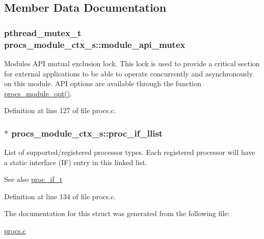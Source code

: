 \subsection{Member Data Documentation}
\subsubsection[{\texorpdfstring{module\+\_\+api\+\_\+mutex}{module_api_mutex}}]{\setlength{\rightskip}{0pt plus 5cm}pthread\+\_\+mutex\+\_\+t procs\+\_\+module\+\_\+ctx\+\_\+s\+::module\+\_\+api\+\_\+mutex}\hypertarget{structprocs__module__ctx__s_a10c3a0b462ead663af1b117abdfdadaa}{}\label{structprocs__module__ctx__s_a10c3a0b462ead663af1b117abdfdadaa}
Module\textquotesingle{}s A\+PI mutual exclusion lock. This lock is used to provide a critical section for external applications to be able to operate concurrently and asynchronously on this module. A\+PI options are available through the function \hyperlink{procs_8c_a226ac6dfd7598a59b9ceab3a92239a80}{procs\+\_\+module\+\_\+opt()}. 

Definition at line 127 of file procs.\+c.

\subsubsection[{\texorpdfstring{proc\+\_\+if\+\_\+llist}{proc_if_llist}}]{$\ast$ procs\+\_\+module\+\_\+ctx\+\_\+s\+::proc\+\_\+if\+\_\+llist}\hypertarget{structprocs__module__ctx__s_a8a7a2cc3f2ee076ae11b7fdc63645f41}{}\label{structprocs__module__ctx__s_a8a7a2cc3f2ee076ae11b7fdc63645f41}
List of supported/registered processor types. Each registered processor will have a static interface (IF) entry in this linked list. \begin{DoxySeeAlso}{See also}
\hyperlink{proc__if_8h_a2b6dbff97f4d62e7a7c7674284620929}{proc\+\_\+if\+\_\+t} 
\end{DoxySeeAlso}


Definition at line 134 of file procs.\+c.



The documentation for this struct was generated from the following file\+:\begin{DoxyCompactItemize}
\item 
\hyperlink{procs_8c}{procs.\+c}\end{DoxyCompactItemize}
